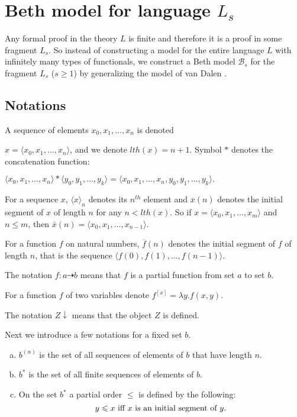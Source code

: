 \documentclass{asl}
\theoremstyle{definition}
\begin{document}
\section{Beth model for language $L_s$}
Any formal proof in the theory $L$ is finite and therefore it is a proof in some fragment $L_s$. So instead of constructing a model for the entire language $L$ with infinitely many types of functionals, we construct a Beth model $\mathcal{B}_s$ for the fragment $L_s$ ($s\geqslant 1$) by generalizing the model of van Dalen \cite{vand78}. 

\subsection{Notations}
A sequence of elements $ x_{0}, x_{1}, \ldots,x_{n} $ is denoted 

\noindent $ x=\langle x_{0}, x_{1}, \ldots,x_{n}\rangle $, and we denote $lth(x)=n+1$. Symbol $ \ast $ denotes the concatenation function: 
\smallskip

$ \langle x_{0}, x_{1}, \ldots,x_{n}\rangle * \langle y_{0}, y_{1}, \ldots,y_{k}\rangle = \langle x_{0}, x_{1}, \ldots,x_{n}, y_{0}, y_{1}, \ldots,y_{k}\rangle.$
\smallskip

For a sequence $ x $, $ \langle x \rangle_{n}$ denotes its $n^{th}$ element and $ \overline{x}(n) $ denotes the initial segment of $ x $ of length $ n $ for any $n<lth(x)$. So if $x=\langle x_{0}, x_{1}, \ldots,x_{m}\rangle$ and $n\leqslant m$, then $\bar{x}(n)=\langle x_{0}, x_{1}, \ldots,x_{n-1}\rangle$.

For a function $ f $ on natural numbers, $ \overline{f}(n) $ denotes the initial segment of $ f $ of length $ n $, that is the sequence  $ \langle f(0), f(1),\ldots,f(n-1) \rangle $.

The notation $ f:a \dashrightarrow b $ means that $ f $ is a partial function from set $ a $ to set $b$. 

For a function $ f $ of two variables denote $ f^{[x]}=\lambda y.f(x,y) $. 

The notation $ Z\downarrow $ means that the object $ Z $ is defined.
\medskip

Next we introduce a few notations for a fixed set $ b $. 
\begin{enumerate}[(a)]
\item $ b^{(n)} $ is the set of all sequences of elements of $ b $ that have length $ n $.

\item $ b^{*} $ is the set of all finite sequences of elements of $ b $.

\item On the set $ b^{*} $ a partial order $ \leqslant $ is defined by the following:
\[ y \leqslant x \textup{  iff  } x \textup{ is an initial segment of }y. \]

\end{enumerate}
\end{document}
